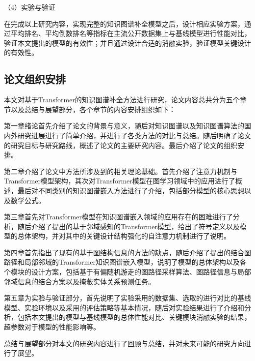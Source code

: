 （4）实验与验证

在完成以上研究内容，实现完整的知识图谱补全模型之后，设计相应实验方案，通过平均排名、平均倒数排名等指标在主流公开数据集上与基线模型进行性能对比，验证本文提出的模型的有效性；并且通过设计合适的消融实验，验证模型关键设计的有效性。

\subsection{论文组织安排}
本文对基于Transformer的知识图谱补全方法进行研究，论文内容总共分为五个章节以及总结与展望部分，各个章节的内容安排组织如下：

第一章绪论首先介绍了论文的背景与意义，随后对知识图谱以及知识图谱算法的国内外研究进展进行了简单介绍，并进行了各类方法的对比与总结。随后明确了论文的研究目标与研究路线，概述了论文的主要研究内容。最后介绍了论文的组织安排。

第二章介绍了论文中方法所涉及到的相关理论基础。首先介绍了注意力机制与Transformer模型架构，其次对Transformer模型在图学习领域中的应用进行了概述，最后对不同类别的知识图谱嵌入方法进行了介绍，包括部分模型的核心思想以及数学公式。

第三章首先对Transformer模型在知识图谱嵌入领域的应用存在的困难进行了分析，随后介绍了提出的基于邻域感知的Transformer模型，给出了符号定义以及模型的总体架构，并对其中的关键设计结构强化的自注意力机制进行了说明。

第四章首先指出了现有的基于图结构信息的方法的缺点，随后介绍了提出的结合图路径和局部邻域的Transformer知识图谱嵌入模型，说明了模型的总体架构以及各个模块的设计方案，包括基于有偏随机游走的图路径采样算法、图路径信息与局部邻域信息的结合方案以及掩蔽实体关系预测任务。

第五章为实验与验证部分，首先说明了实验采用的数据集、选取的进行对比的基线模型、实验环境以及采用的评估策略等基本情况，随后对实验结果进行了介绍和分析，包括本文提出的模型与基线模型的总体性能对比、关键模块消融实验的结果，超参数对于模型的性能影响等。

总结与展望部分对本文的研究内容进行了回顾与总结，并对未来可能的研究方向进行了展望。